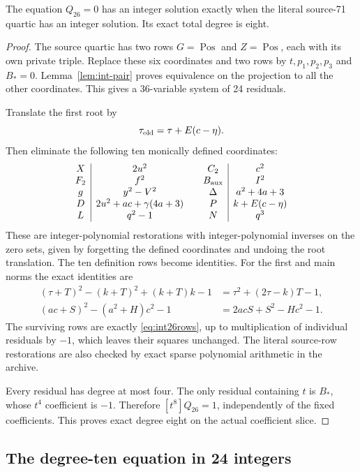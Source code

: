 \begin{proposition}
The equation $Q_{26}=0$ has an integer solution exactly when the literal
source-71 quartic has an integer solution.  Its exact total degree is eight.
\end{proposition}
\begin{proof}
The source quartic has two rows $G=\operatorname{Pos}$ and
$Z=\operatorname{Pos}$, each with its own private triple.  Replace these
six coordinates and two rows by $t,p_1,p_2,p_3$ and $B_*=0$.
Lemma~\ref{lem:int-pair} proves equivalence on the projection to all the
other coordinates.  This gives a 36-variable system of 24 residuals.

Translate the first root by
\[
 \tau_{\rm old}=\tau+E(c-\eta).
\]
Then eliminate the following ten monically defined coordinates:
\[
\begin{array}{c|c@{\qquad}c|c}
 X&2u^2 & C_2&c^2\\
 F_2&f^2 & B_{\rm aux}&I^2\\
 g&y^2-V^2 & \Delta&a^2+4a+3\\
 D&2u^2+ac+\gamma(4a+3)&P&k+E(c-\eta)\\
 L&q^2-1&N&q^3
\end{array}
\]
These are integer-polynomial restorations with integer-polynomial inverses
on the zero sets, given by forgetting the defined coordinates and undoing
the root translation.  The ten definition rows become identities.
For the first and main norms the exact identities are
\begin{align*}
 (\tau+T)^2-(k+T)^2+(k+T)k-1
   &=\tau^2+(2\tau-k)T-1,\\
 (ac+S)^2-(a^2+H)c^2-1
   &=2acS+S^2-Hc^2-1.
\end{align*}
The surviving rows are exactly \eqref{eq:int26rows}, up to multiplication
of individual residuals by $-1$, which leaves their squares unchanged.
The literal source-row restorations are also checked by exact sparse
polynomial arithmetic in the archive.

Every residual has degree at most four.  The only residual containing
$t$ is $B_*$, whose $t^4$ coefficient is $-1$.  Therefore
$[t^8]Q_{26}=1$, independently of the fixed coefficients.  This proves
exact degree eight on the actual coefficient slice.
\end{proof}

\subsection{The degree-ten equation in 24 integers}

